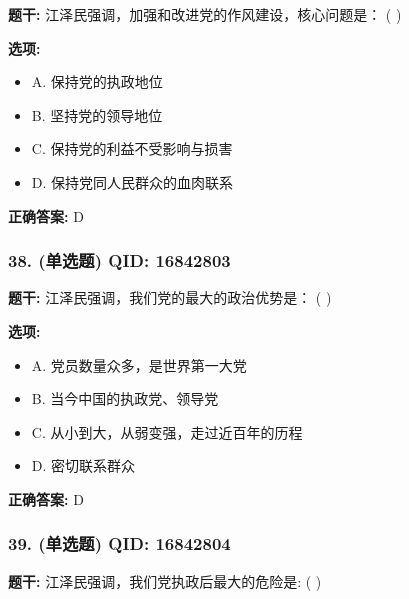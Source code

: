 \documentclass[12pt,UTF8]{ctexart}
\begin{document}
\textbf{题干:}
江泽民强调，加强和改进党的作风建设，核心问题是： ( )

\textbf{选项:}
\begin{itemize}[leftmargin=*]

  \item A. 保持党的执政地位

  \item B. 坚持党的领导地位

  \item C. 保持党的利益不受影响与损害

  \item D. 保持党同人民群众的血肉联系

\end{itemize}

\textbf{正确答案:}
D

\vspace{0.3em}\hrulefill\vspace{0.7em}

\subsubsection*{38. (单选题) \small QID: 16842803}

\textbf{题干:}
江泽民强调，我们党的最大的政治优势是： ( )

\textbf{选项:}
\begin{itemize}[leftmargin=*]

  \item A. 党员数量众多，是世界第一大党

  \item B. 当今中国的执政党、领导党

  \item C. 从小到大，从弱变强，走过近百年的历程

  \item D. 密切联系群众

\end{itemize}

\textbf{正确答案:}
D

\vspace{0.3em}\hrulefill\vspace{0.7em}

\subsubsection*{39. (单选题) \small QID: 16842804}

\textbf{题干:}
江泽民强调，我们党执政后最大的危险是: ( )
\end{document}
